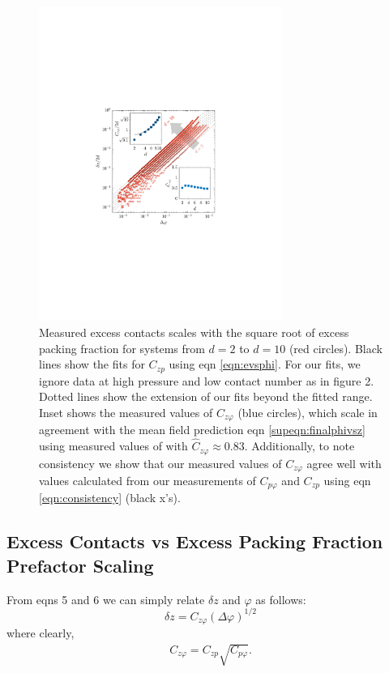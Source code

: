 \begin{figure}[th!]
\includegraphics[width=300px, trim=143 240 168 250, clip]{excessContactsScaling/evsphi.pdf}

\caption{Measured excess contacts scales with the square root of excess packing fraction for systems from $d=2$ to $d=10$ (red circles). Black lines show the fits for $C_{zp}$ using eqn \ref{eqn:evsphi}. For our fits, we ignore data at high pressure and low contact number as in figure 2.
Dotted lines show the extension of our fits beyond the fitted range. Inset shows the measured values of $C_{z\varphi}$ (blue circles), which scale in agreement with the mean field prediction eqn \ref{supeqn:finalphivsz} using measured values of with $\hat{C}_{z\varphi} \approx 0.83$. Additionally, to note consistency we show that our measured values of $C_{z\varphi}$ agree well with values calculated from our measurements of $C_{p\varphi}$ and $C_{zp}$ using eqn \ref{eqn:consistency} (black x's).}

\label{plot:evsphi}
\end{figure}
%
\subsection{Excess Contacts vs Excess Packing Fraction Prefactor Scaling}

From eqns 5
and 6
we can simply relate $\delta z$ and $\varphi$ as follows:
%
\begin{equation}
\delta z=C_{z\varphi}\left(\Delta\varphi\right)^{1/2} \label{eqn:evsphi}
\end{equation}
%
where clearly, 
\begin{align}
C_{z\varphi}=C_{zp}\sqrt{C_{p\varphi}}. \label{eqn:consistency}
\end{align}

